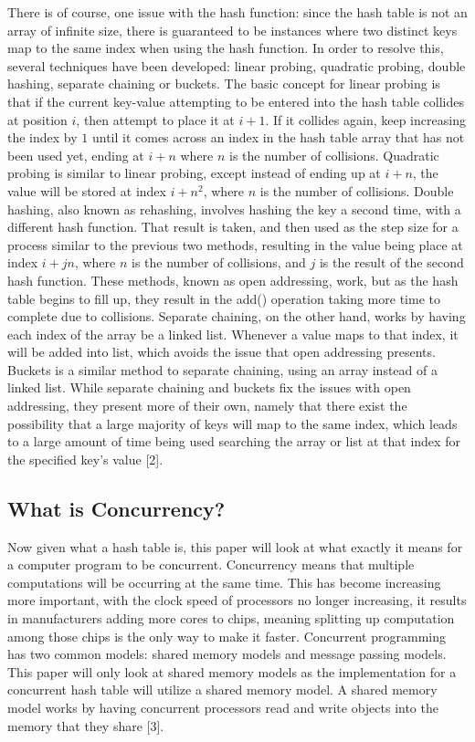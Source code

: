 \documentclass[conference]{IEEEtran}
\begin{document}
There is of course, one issue with the hash function: since the hash table is not an array of infinite size, there is guaranteed to be instances where
two distinct keys map to the same index when using the hash function. In order to resolve this, several techniques have been developed: linear probing,
quadratic probing, double hashing, separate chaining or buckets. The basic concept for linear probing is that if the current key-value attempting to be
entered into the hash table collides at position $i$, then attempt to place it at $i+1$. If it collides again, keep increasing the index by $1$ until
it comes across an index in the hash table array that has not been used yet, ending at $i+n$ where $n$ is the number of collisions. Quadratic probing is
similar to linear probing, except instead of ending up at $i+n$, the value will be stored at index $i+n^2$, where $n$ is the number of collisions.
Double hashing, also known as rehashing, involves hashing the key a second time, with a different hash function. That result is taken, and then used as
the step size for a process similar to the previous two methods, resulting in the value being place at index $i+jn$, where $n$ is the number of collisions,
and $j$ is the result of the second hash function. These methods, known as open addressing, work, but as the hash table begins to fill up, they result in the 
add() operation taking more time to complete due to collisions. Separate chaining, on the other hand, works by having each index of the array be a linked list. 
Whenever a value maps to that index, it will be added into list, which avoids the issue that open addressing presents. Buckets is a similar method to 
separate chaining, using an array instead of a linked list. While separate chaining and buckets fix the issues with open addressing, they present more
of their own, namely that there exist the possibility that a large majority of keys will map to the same index, which leads to a large amount of time
being used searching the array or list at that index for the specified key's value [2].

\subsection{What is Concurrency?}
Now given what a hash table is, this paper will look at what exactly it means for a computer program to be concurrent. Concurrency means that multiple computations
will be occurring at the same time. This has become increasing more important, with the clock speed of processors no longer increasing, it results in 
manufacturers adding more cores to chips, meaning splitting up computation among those chips is the only way to make it faster. Concurrent programming
has two common models: shared memory models and message passing models. This paper will only look at shared memory models as the implementation for
a concurrent hash table will utilize a shared memory model. A shared memory model works by having concurrent processors read and write objects into the
memory that they share [3].
\end{document}
